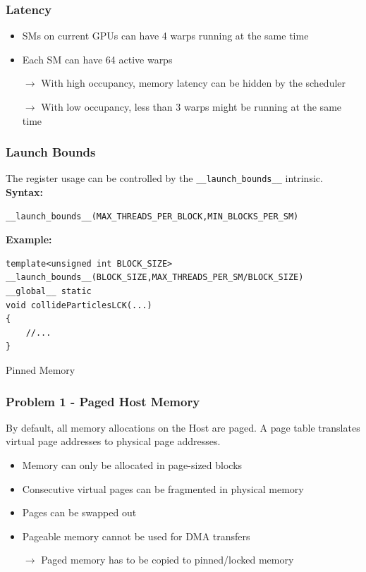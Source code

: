 \documentclass[aspectratio=169,handout]{beamer}
\begin{document}
\begin{frame}[fragile]
\frametitle{Latency}

\begin{itemize}
	\item SMs on current GPUs can have 4 warps running at the same time
	\item Each SM can have 64 active warps
	\item[$\rightarrow$] With high occupancy, memory latency can be hidden by the scheduler
	\item[$\rightarrow$] With low occupancy, less than 3 warps might be running at the same time
\end{itemize}
\end{frame}



\begin{frame}[fragile]
\frametitle{Launch Bounds}
	The register usage can be controlled by the \texttt{\_\_launch\_bounds\_\_} intrinsic. \\
	\textbf{Syntax:}
\begin{lstlisting}
__launch_bounds__(MAX_THREADS_PER_BLOCK,MIN_BLOCKS_PER_SM)
\end{lstlisting}
\textbf{Example:}
\begin{lstlisting}
template<unsigned int BLOCK_SIZE>
__launch_bounds__(BLOCK_SIZE,MAX_THREADS_PER_SM/BLOCK_SIZE)
__global__ static
void collideParticlesLCK(...)
{
 	//...
}
\end{lstlisting}

\end{frame}



\frame
{
\begin{center}
\Large Pinned Memory
\end{center}
}



\begin{frame}[fragile]
\frametitle{Problem 1 - Paged Host Memory}
By default, all memory allocations on the Host are paged. A page table translates virtual page addresses to physical page addresses.
\begin{itemize}
	\item Memory can only be allocated in page-sized blocks
	\item Consecutive virtual pages can be fragmented in physical memory
	\item Pages can be swapped out
	\item Pageable memory cannot be used for DMA transfers
	\item[$\rightarrow$] Paged memory has to be copied to pinned/locked memory
\end{itemize}

\end{frame}
\end{document}
